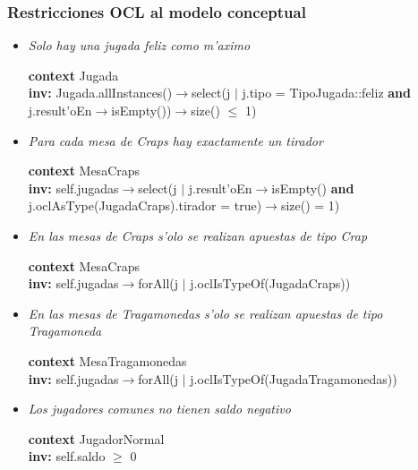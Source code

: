 \subsubsection{Restricciones OCL al modelo conceptual}
\begin{itemize}



\item \textit{Solo hay una jugada feliz como m'aximo}

\textbf{context} Jugada \\ \textbf{inv:}
    Jugada.allInstances()$\rightarrow$select(j $|$ j.tipo = TipoJugada::feliz \textbf{and} j.result'oEn$\rightarrow$isEmpty())$\rightarrow$size() $\leq$ 1)



\item \textit{Para cada mesa de Craps hay exactamente un tirador}

\textbf{context}  MesaCraps \\ \textbf{inv:} 
    self.jugadas$\rightarrow$select(j $|$ j.result'oEn$\rightarrow$isEmpty() \textbf{and} j.oclAsType(JugadaCraps).tirador = true)$\rightarrow$size() = 1)



\item \textit{En las mesas de Craps s'olo se realizan apuestas de tipo Crap} 

\textbf{context}  MesaCraps \\ \textbf{inv:} 
    self.jugadas$\rightarrow$forAll(j $|$ j.oclIsTypeOf(JugadaCraps))



\item \textit{En las mesas de Tragamonedas s'olo se realizan apuestas de tipo Tragamoneda}

\textbf{context}  MesaTragamonedas \\ \textbf{inv:} 
    self.jugadas$\rightarrow$forAll(j $|$ j.oclIsTypeOf(JugadaTragamonedas))



\item \textit{Los jugadores comunes no tienen saldo negativo}

\textbf{context} JugadorNormal \\ \textbf{inv:}
    self.saldo $\geq$ 0
  

\end{itemize}
